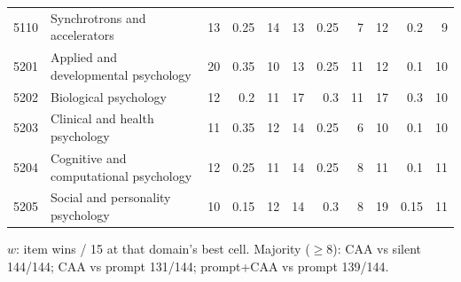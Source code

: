 \begin{longtable}{r p{2.15cm} rrr rrr rrr}
5110 & Synchrotrons and accelerators & 13 & 0.25 & 14 & 13 & 0.25 & 7 & 12 & 0.2 & 9 \\
5201 & Applied and developmental psychology & 20 & 0.35 & 10 & 13 & 0.25 & 11 & 12 & 0.1 & 10 \\
5202 & Biological psychology & 12 & 0.2 & 11 & 17 & 0.3 & 11 & 17 & 0.3 & 10 \\
5203 & Clinical and health psychology & 11 & 0.35 & 12 & 14 & 0.25 & 6 & 10 & 0.1 & 10 \\
5204 & Cognitive and computational psychology & 12 & 0.25 & 11 & 14 & 0.25 & 8 & 11 & 0.1 & 11 \\
5205 & Social and personality psychology & 10 & 0.15 & 12 & 14 & 0.3 & 8 & 19 & 0.15 & 11 \\

\end{longtable}
{\small $w$: item wins / 15 at that domain's best cell. Majority ($\geq 8$): CAA vs silent 144/144; CAA vs prompt 131/144; prompt+CAA vs prompt 139/144.}

\endgroup
